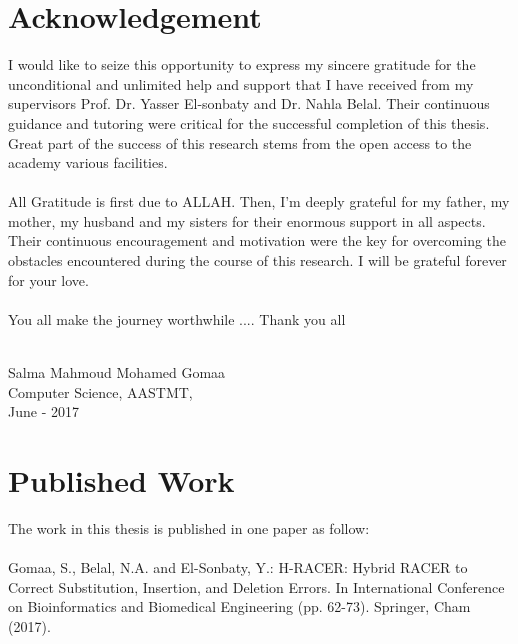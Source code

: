 \documentclass[12pt,openany]{llncs}
\begin{document}
\clearpage


\section*{Acknowledgement}\thispagestyle{fancy}

I would like to seize this opportunity to express my sincere gratitude for the
unconditional and unlimited help and support that I have received from my supervisors Prof.
Dr. Yasser El-sonbaty and Dr. Nahla Belal. Their continuous guidance and tutoring were
critical for the successful completion of this thesis. Great part of the success of this research stems from the open access to the academy various facilities. 
\\
\\
All Gratitude is first due to ALLAH. Then, I'm deeply grateful for my father, my mother, my husband and my sisters for their enormous support in all aspects. Their continuous encouragement and motivation were the key for overcoming the obstacles encountered during the course of this research. I will be grateful forever for your love.
\\
\\
You all make the journey worthwhile .... Thank you all
\\
\\
\begin{flushright}
Salma Mahmoud Mohamed Gomaa\\
Computer Science, AASTMT,\\
June - 2017
\end{flushright}

\clearpage
\section*{Published Work}\thispagestyle{fancy}
\noindent\hspace{0.6cm}The work in this thesis is published in one paper as follow:
\\
\\
Gomaa, S., Belal, N.A. and El-Sonbaty, Y.: H-RACER: Hybrid RACER to Correct Substitution, Insertion, and Deletion Errors. In International Conference on Bioinformatics and Biomedical Engineering (pp. 62-73). Springer, Cham (2017).

\clearpage
\end{document}
